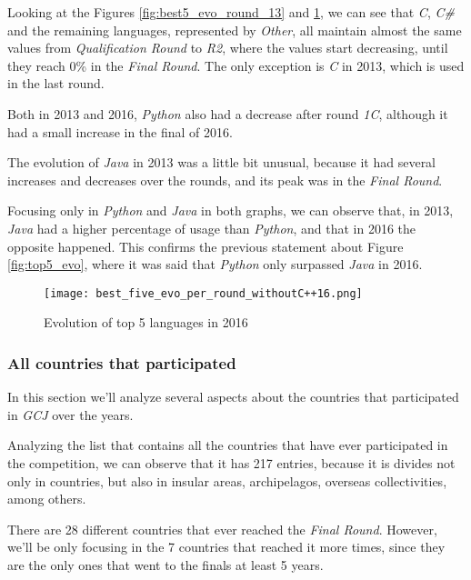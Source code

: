 \documentclass{article}
\begin{document}
\begin{multicols*}{2}
Looking at the Figures \ref{fig:best5_evo_round_13} and \ref{fig:best5_evo_round_16}, we can see that \textit{C}, \textit{C\#} and the remaining languages, represented by \textit{Other}, all maintain almost the same values from \textit{Qualification Round} to \textit{R2}, where the values start decreasing, until they reach 0\% in the \textit{Final Round}. The only exception is \textit{C} in 2013, which is used in the last round.

Both in 2013 and 2016, \textit{Python} also had a decrease after round \textit{1C}, although it had a small increase in the final of 2016.

The evolution of \textit{Java} in 2013 was a little bit unusual, because it had several increases and decreases over the rounds, and its peak was in the \textit{Final Round}.

Focusing only in \textit{Python} and \textit{Java} in both graphs, we can observe that, in 2013, \textit{Java} had a higher percentage of usage than \textit{Python}, and that in 2016 the opposite happened. This confirms the previous statement about Figure \ref{fig:top5_evo}, where it was said that \textit{Python} only surpassed \textit{Java} in 2016.

\begin{figure}[H]
    \centering
    \texttt{[image: best\_five\_evo\_per\_round\_withoutC++16.png]}
    \caption{Evolution of top 5 languages in 2016}
    \label{fig:best5_evo_round_16}
\end{figure}


\subsubsection{All countries that participated}

In this section we'll analyze several aspects about the countries that participated in \textit{GCJ} over the years.

Analyzing the list that contains all the countries that have ever participated in the competition, we can observe that it has 217 entries, because it is divides not only in countries, but also in insular areas, archipelagos, overseas collectivities, among others.

There are 28 different countries that ever reached the \textit{Final Round}. However, we'll be only focusing in the 7 countries that reached it more times, since they are the only ones that went to the finals at least 5 years.




\end{multicols*}
\end{document}
